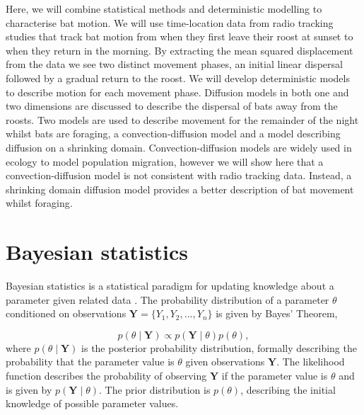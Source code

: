 Here, we will combine statistical methods and deterministic modelling to characterise bat motion. We will use time-location data from radio tracking studies that track bat motion from when they first leave their roost at sunset to when they return in the morning. By extracting the mean squared displacement from the data we see two distinct movement phases, an initial linear dispersal followed by a gradual return to the roost. We will develop deterministic models to describe motion for each movement phase. Diffusion models in both one and two dimensions are discussed to describe the dispersal of bats away from the roosts. Two models are used to describe movement for the remainder of the night whilst bats are foraging, a convection-diffusion model and a model describing diffusion on a shrinking domain. Convection-diffusion models are widely used in ecology to model population migration, however we will show here that a convection-diffusion model is not consistent with radio tracking data. Instead, a shrinking domain diffusion model provides a better description of bat movement whilst foraging.

 \section{Bayesian statistics}
 Bayesian
statistics is a statistical
paradigm for updating knowledge about a
 parameter
given related data
\cite{Gelman2013}. The probability distribution of a
parameter
 $\theta$
conditioned on observations $\bm{Y} = \{ Y_1, Y_2, ..., Y_n
\}$ is
 given by
Bayes' Theorem,

 \begin{equation}
   p(\theta \mid \bm{Y})
\propto
p(\bm{Y} \mid \theta) p(\theta)
   \nonumber,
 \end{equation}
 where
$p(\theta \mid \bm{Y})$ is the posterior probability distribution, formally
describing the probability that the parameter value is $\theta$ given
observations $\bm{Y}$. The likelihood function describes the probability of observing $\bm{Y}$ if the parameter value is $\theta$ and is given by $p(\bm{Y} \mid \theta)$.
The
 prior distribution is $p(\theta)$, describing the initial knowledge of
possible
 parameter values.

